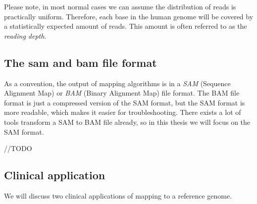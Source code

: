 Please note, in most normal cases we can assume the distribution of reads is practically uniform. Therefore, each base in the human genome will be covered by a statistically expected amount of reads. This amount is often referred to as the \emph{reading depth}.


\subsection{The sam and bam file format}

As a convention, the output of mapping algorithms is in a \emph{SAM} (Sequence Alignment Map) or \emph{BAM} (Binary Alignment Map) file format. The BAM file format is just a compressed version of the SAM format, but the SAM format is more readable, which makes it easier for troubleshooting. There exists a lot of tools transform a SAM to BAM file already, so in this thesis we will focus on the SAM format.

//TODO

\subsection{Clinical application}

We will discuss two clinical applications of mapping to a reference genome.

